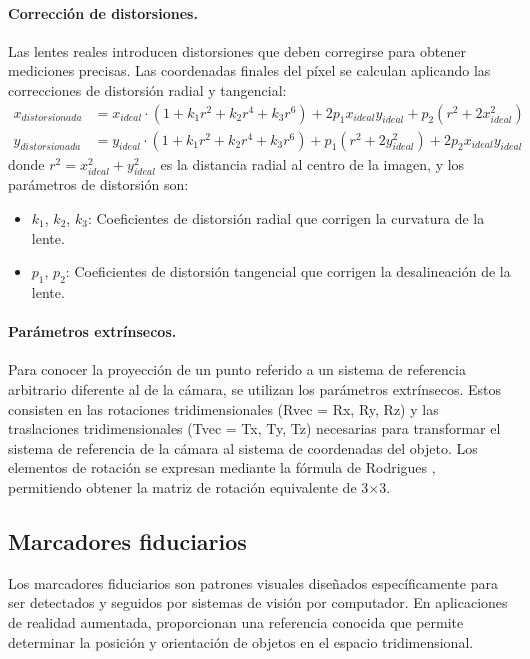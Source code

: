 \paragraph{Corrección de distorsiones.}
Las lentes reales introducen distorsiones que deben corregirse para obtener mediciones precisas. Las coordenadas finales del píxel se calculan aplicando las correcciones de distorsión radial y tangencial:
\begin{align*}
	x_{distorsionada} &= x_{ideal} \cdot (1 + k_1 r^2 + k_2 r^4 + k_3 r^6) + 2p_1 x_{ideal} y_{ideal} + p_2(r^2 + 2x_{ideal}^2) \\
	y_{distorsionada} &= y_{ideal} \cdot (1 + k_1 r^2 + k_2 r^4 + k_3 r^6) + p_1(r^2 + 2y_{ideal}^2) + 2p_2 x_{ideal} y_{ideal}
\end{align*}
donde $r^2 = x_{ideal}^2 + y_{ideal}^2$ es la distancia radial al centro de la imagen, y los parámetros de distorsión son:
\begin{itemize}
	\item $k_1$, $k_2$, $k_3$: Coeficientes de distorsión radial que corrigen la curvatura de la lente.
	\item $p_1$, $p_2$: Coeficientes de distorsión tangencial que corrigen la desalineación de la lente.
\end{itemize}

\paragraph{Parámetros extrínsecos.}
Para conocer la proyección de un punto referido a un sistema de referencia arbitrario diferente al de la cámara, se utilizan los parámetros extrínsecos. Estos consisten en las rotaciones tridimensionales (Rvec = {Rx, Ry, Rz}) y las traslaciones tridimensionales (Tvec = {Tx, Ty, Tz}) necesarias para transformar el sistema de referencia de la cámara al sistema de coordenadas del objeto. Los elementos de rotación se expresan mediante la fórmula de Rodrigues \cite{mebius2007derivation}, permitiendo obtener la matriz de rotación equivalente de 3×3.

\subsection{Marcadores fiduciarios}

Los marcadores fiduciarios son patrones visuales diseñados específicamente para ser detectados y seguidos por sistemas de visión por computador. En aplicaciones de realidad aumentada, proporcionan una referencia conocida que permite determinar la posición y orientación de objetos en el espacio tridimensional.

